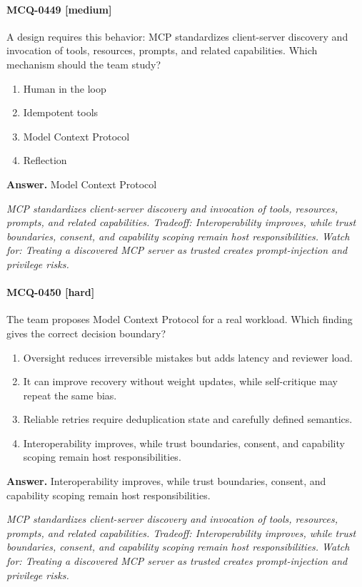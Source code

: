 \paragraph{MCQ-0449 [medium]} A design requires this behavior: MCP standardizes client-server discovery and invocation of tools, resources, prompts, and related capabilities. Which mechanism should the team study?
\begin{enumerate}[label=\Alph*.]
\item Human in the loop
\item Idempotent tools
\item Model Context Protocol
\item Reflection
\end{enumerate}
\noindent\textbf{Answer.} Model Context Protocol
\par\textit{MCP standardizes client-server discovery and invocation of tools, resources, prompts, and related capabilities. Tradeoff: Interoperability improves, while trust boundaries, consent, and capability scoping remain host responsibilities. Watch for: Treating a discovered MCP server as trusted creates prompt-injection and privilege risks.}
\paragraph{MCQ-0450 [hard]} The team proposes Model Context Protocol for a real workload. Which finding gives the correct decision boundary?
\begin{enumerate}[label=\Alph*.]
\item Oversight reduces irreversible mistakes but adds latency and reviewer load.
\item It can improve recovery without weight updates, while self-critique may repeat the same bias.
\item Reliable retries require deduplication state and carefully defined semantics.
\item Interoperability improves, while trust boundaries, consent, and capability scoping remain host responsibilities.
\end{enumerate}
\noindent\textbf{Answer.} Interoperability improves, while trust boundaries, consent, and capability scoping remain host responsibilities.
\par\textit{MCP standardizes client-server discovery and invocation of tools, resources, prompts, and related capabilities. Tradeoff: Interoperability improves, while trust boundaries, consent, and capability scoping remain host responsibilities. Watch for: Treating a discovered MCP server as trusted creates prompt-injection and privilege risks.}
